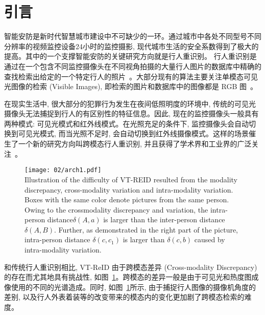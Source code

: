 \section{引言}
智能安防是新时代智慧城市建设中不可缺少的一环。通过城市中各处不同型号不同分辨率的视频监控设备24小时的监控摄影, 现代城市生活的安全系数得到了极大的提高。其中的一个支撑智能安防的关键研究方向就是行人重识别。 行人重识别是通过在一个包含不同监控摄像头在不同视角拍摄的大量行人图片的数据库中精确的查找检索出给定的一个特定行人的照片~\cite{wang2016scale,zheng2017sift}。大部分现有的算法主要关注单模态可见光图像的检索 (Visible Images), 即检索的图片和数据库中的图像都是 RGB 图~\cite{ahmed2015improved,koestinger2012large, li2014deepreid, li2015multi, li2013learning, liao2015person, wu2016enhanced, xiao2016learning, zhu2017part, chen2017multi, ge2018fd, li2018harmonious,chen2021harmonious, tang2022harmonious, xu2018attention, yao2019deep, zheng2019joint}。\par
在现实生活中, 很大部分的犯罪行为发生在夜间低照明度的环境中, 传统的可见光摄像头无法捕捉到行人的有区别性的特征信息。因此, 现在的监控摄像头一般具有两种模式: 可见光模式和红外线模式。在光照充足的条件下, 监控摄像头会自动切换到可见光模式, 而当光照不足时, 会自动切换到红外线摄像模式。这样的场景催生了一个新的研究方向叫跨模态行人重识别, 并且获得了学术界和工业界的广泛关注~\cite{zheng2019joint}。
\begin{figure}[!htp]
    \centering
    \texttt{[image: 02/arch1.pdf]} \\
      {Illustration of the difficulty of VT-REID resulted from the modality discrepancy, cross-modality variation and intra-modality variation. Boxes with the same color denote pictures from the same person. Owing to the crossmodality discrepancy and variation, the intra-person distance$ \delta(A,a)$ is larger than the inter-person distance $\delta(A, B)$. Further, as demonstrated in the right part of the picture, intra-person distance $\delta(c,c_1)$ is larger than $\delta(c,b)$ caused by intra-modality variation.}
   \label{fig:arch1}
\end{figure} 
和传统行人重识别相比, VT-ReID 由于跨模态差异 (Cross-modality Discrepancy)的存在而尤其地具有挑战性, 如图~\ref{fig:arch1}。跨模态的差异一般是由于可见光和热度图成像使用的不同的光谱造成。同时, 如图~\ref{fig:arch1}所示, 由于捕捉行人图像的摄像机角度的差别, 以及行人外表着装等的改变带来的模态内的变化更加剧了跨模态检索的难度。\par
